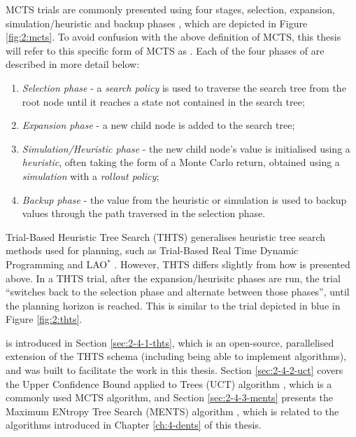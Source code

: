     MCTS trials are commonly presented using four stages, selection, expansion, simulation/heuristic and backup phases \cite{mcts_survey}, which are depicted in Figure \ref{fig:2:mcts}. To avoid confusion with the above definition of MCTS, this thesis will refer to this specific form of MCTS as \mctsone. Each of the four phases of \mctsone\ewe are described in more detail below: 
    \begin{enumerate}
        \item \textit{Selection phase} - a \textit{search policy} is used to traverse the search tree from the root node until it reaches a state not contained in the search tree;
        \item \textit{Expansion phase} - a new child node is added to the search tree;
        \item \textit{Simulation/Heuristic phase} - the new child node's value is initialised using a \textit{heuristic}, often taking the form of a Monte Carlo return, obtained using a \textit{simulation} with a \textit{rollout policy}; 
        \item \textit{Backup phase} - the value from the heuristic or simulation is used to backup values through the path traversed in the selection phase.
    \end{enumerate}

    Trial-Based Heuristic Tree Search (THTS) \cite{thts} generalises heuristic tree search methods used for planning, such as Trial-Based Real Time Dynamic Programming \cite{rtdp} and LAO$^*$ \cite{lao_star}. However, THTS differs slightly from how \mctsone\ewe is presented above. In a THTS trial, after the expansion/heurisitc phases are run, the trial ``switches back to the selection phase and alternate between those phases'', until the planning horizon is reached. This is similar to the trial depicted in blue in Figure \ref{fig:2:thts}.

    \thtspp\ewe \cite{thtspp} is introduced in Section \ref{sec:2-4-1-thts}, which is an open-source, parallelised extension of the THTS schema (including being able to implement \mctsone\ewe algorithms), and was built to facilitate the work in this thesis. Section \ref{sec:2-4-2-uct} covers the Upper Confidence Bound applied to Trees (UCT) algorithm \cite{uct,uct_long}, which is a commonly used MCTS algorithm, and Section \ref{sec:2-4-3-ments} presents the Maximum ENtropy Tree Search (MENTS) algorithm \cite{ments}, which is related to the algorithms introduced in Chapter \ref{ch:4-dents} of this thesis.
    

